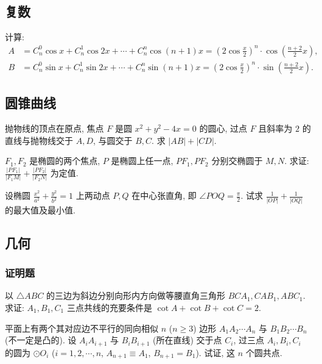 \subsection{复数}
计算:
\begin{align*}
	A & = C_n^0\cos x+C_n^1\cos 2x+\cdots+C_n^n\cos(n+1)x=\left(2\cos\frac{x}2\right)^{n}\cdot\cos\left(\frac{n+2}{2}x\right),\\
	B & = C_n^0\sin x+C_n^1\sin 2x+\cdots+C_n^n\sin(n+1)x=\left(2\cos\frac{x}2\right)^{n}\cdot\sin\left(\frac{n+2}{2}x\right).
\end{align*}
\eq

\subsection{圆锥曲线}

抛物线的顶点在原点, 焦点 $F$ 是圆 $x^2+y^2-4x=0$ 的圆心, 过点 $F$ 且斜率为 $2$ 的直线与抛物线交于 $A,D$, 与圆交于 $B,C$. 求 $|AB|+|CD|$.
\eq

$F_1,F_2$ 是椭圆的两个焦点, $P$ 是椭圆上任一点, $PF_1,PF_2$ 分别交椭圆于 $M,N$. 求证: $\frac{|PF_1|}{|F_1M|}+\frac{|PF_2|}{|F_2N|}$ 为定值.
\eq

设椭圆 $\frac{x^2}{a^2}+\frac{y^2}{b^2}=1$ 上两动点 $P,Q$ 在中心张直角, 即 $\angle POQ=\frac{\pi}{2}$. 试求 $\frac1{|OP|}+\frac1{|OQ|}$ 的最大值及最小值.
\eq

\subsection{几何}

\subsubsection{证明题}
以 $\triangle ABC$ 的三边为斜边分别向形内方向做等腰直角三角形 $BCA_1, CAB_1,ABC_1$. 
求证: $A_1, B_1, C_1$ 三点共线的充要条件是 $\cot A+\cot B+\cot C=2$.
\eq

平面上有两个其对应边不平行的同向相似 $n$ ($n\ge 3$) 边形 $A_1A_2\cdots A_n$ 与 $B_1B_2\cdots B_n$ (不一定是凸的). 
设 $A_i A_{i+1}$ 与 $B_i B_{i+1}$ (所在直线) 交于点 $C_i$, 过三点 $A_i, B_i, C_i$ 的圆为 $\odot O_i$ ($i=1,2,\cdots,n$, $A_{n+1}\equiv A_1$, $B_{n+1}=B_1$). 试证, 这 $n$ 个圆共点.
\eq

